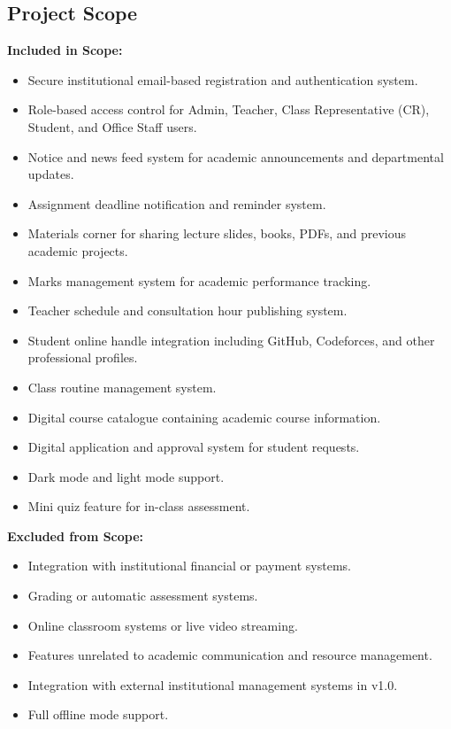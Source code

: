 \documentclass[12pt,a4paper]{article}
\begin{document}
\subsection{Project Scope}

\textbf{Included in Scope:}

\begin{itemize}[leftmargin=*, label=\textbullet, itemsep=3pt]
  \item Secure institutional email-based registration and authentication system.
  \item Role-based access control for Admin, Teacher, Class Representative (CR), Student, and Office Staff users.
  \item Notice and news feed system for academic announcements and departmental updates.
  \item Assignment deadline notification and reminder system.
  \item Materials corner for sharing lecture slides, books, PDFs, and previous academic projects.
  \item Marks management system for academic performance tracking.
  \item Teacher schedule and consultation hour publishing system.
  \item Student online handle integration including GitHub, Codeforces, and other professional profiles.
  \item Class routine management system.
  \item Digital course catalogue containing academic course information.
  \item Digital application and approval system for student requests.
  \item Dark mode and light mode support.
  \item Mini quiz feature for in-class assessment.
\end{itemize}

\newpage
\textbf{Excluded from Scope:}

\begin{itemize}[leftmargin=*, label=\textbullet, itemsep=3pt]
  \item Integration with institutional financial or payment systems.
  \item Grading or automatic assessment systems.
  \item Online classroom systems or live video streaming.
  \item Features unrelated to academic communication and resource management.
  \item Integration with external institutional management systems in v1.0.
  \item Full offline mode support.
\end{itemize}
\end{document}

